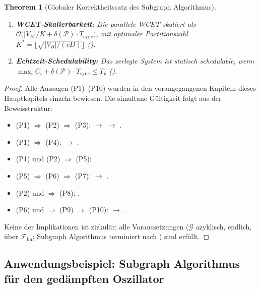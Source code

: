 ﻿\documentclass[12pt,a4paper]{article}
\newtheorem{theorem}{Theorem}[section]
\theoremstyle{definition}
\begin{document}
\begin{theorem}[Globaler Korrektheitssatz des Subgraph Algorithmus]
\begin{enumerate}[label=\textbf{(P\arabic*)}]
  \item \textbf{WCET-Skalierbarkeit:}
        Die parallele WCET skaliert als
        $\mathcal{O}\bigl(|V_B|/K + \delta(\mathcal{P}) \cdot T_{\mathrm{sync}}\bigr)$,
        mit optimaler Partitionszahl
        $K^* = \lfloor\sqrt{|V_B|/(cD)}\rfloor$
        ().

  \item \textbf{Echtzeit-Schedulability:}
        Das zerlegte System ist statisch schedulable, wenn
        $\max_i C_i + \delta(\mathcal{P}) \cdot T_{\mathrm{sync}} \leq T_p$
        ().
\end{enumerate}
\end{theorem}

\begin{proof}
Alle Aussagen (P1)--(P10) wurden in den vorangegangenen Kapiteln
dieses Hauptkapitels einzeln bewiesen. Die simultane Gültigkeit folgt aus
der Beweisstruktur:
\begin{itemize}[nosep]
  \item (P1) $\Rightarrow$ (P2) $\Rightarrow$ (P3):
         $\to$  $\to$ .
  \item (P1) $\Rightarrow$ (P4):
         $\to$ .
  \item (P1) und (P2) $\Rightarrow$ (P5):
        .
  \item (P5) $\Rightarrow$ (P6) $\Rightarrow$ (P7):
         $\to$ .
  \item (P2) und  $\Rightarrow$ (P8):
        .
  \item (P6) und  $\Rightarrow$ (P9) $\Rightarrow$ (P10):
         $\to$ .
\end{itemize}
Keine der Implikationen ist zirkulär; alle Voraussetzungen
($\mathcal{G}$ azyklisch, endlich, über $\mathcal{F}_{\mathrm{lin}}$;
Subgraph Algorithmus terminiert nach ) sind erfüllt.
\end{proof}

\subsection{Anwendungsbeispiel: Subgraph Algorithmus für den gedämpften Oszillator}
\label{subsec:subgraph-example}
\end{document}
